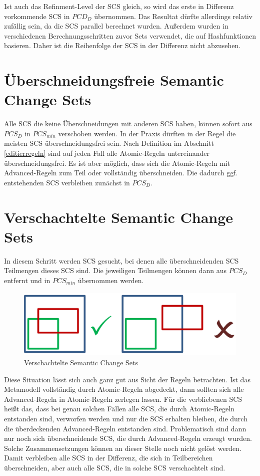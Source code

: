 Ist auch das Refinment-Level der SCS gleich, so wird das erste in Differenz vorkommende SCS in
$PCD_D$ übernommen. Das Resultat dürfte allerdings relativ zufällig sein, da die SCS parallel
berechnet wurden. Außerdem wurden in verschiedenen Berechnungsschritten zuvor Sets verwendet, die
auf Hashfunktionen basieren. Daher ist die Reihenfolge der SCS in der Differenz nicht abzusehen.

\section{Überschneidungsfreie Semantic Change Sets}

Alle SCS die keine Überschneidungen mit anderen SCS haben, können sofort aus $PCS_D$ in $PCS_{min}$
verschoben werden. In der Praxis dürften in der Regel die meisten SCS überschneidungsfrei sein. Nach
Definition im Abschnitt \ref{editierregeln} sind auf jeden Fall alle Atomic-Regeln untereinander
überschneidungsfrei. Es ist aber möglich, dass sich die Atomic-Regeln mit Advanced-Regeln zum Teil
oder vollständig überschneiden. Die dadurch ggf. entstehenden SCS verbleiben zunächst in $PCS_D$.

\section{Verschachtelte Semantic Change Sets}

In diesem Schritt werden SCS gesucht, bei denen alle überschneidenden SCS Teilmengen dieses SCS
sind. Die jeweiligen Teilmengen können dann aus $PCS_D$ entfernt und in $PCS_{min}$ übernommen
werden.

\begin{figure}[h!]
  \centering
  \includegraphics[scale=0.5]{images/post_processing_nested.png}
  \caption{Verschachtelte Semantic Change Sets}
  \label{fig:post_processing_nested}
\end{figure}

Diese Situation lässt sich auch ganz gut aus Sicht der Regeln betrachten. Ist das Metamodell
vollständig durch Atomic-Regeln abgedeckt, dann sollten sich alle Advanced-Regeln in Atomic-Regeln
zerlegen lassen. Für die verbliebenen SCS heißt das, dass bei genau solchen Fällen alle SCS, die
durch Atomic-Regeln entstanden sind, verworfen werden und nur die SCS erhalten bleiben, die durch
die überdeckenden Advanced-Regeln entstanden sind. Problematisch sind dann nur noch sich überschneidende
SCS, die durch Advanced-Regeln erzeugt wurden. Solche Zusammensetzungen können an dieser Stelle noch
nicht gelöst werden. Damit verbleiben alle SCS in der Differenz, die sich in Teilbereichen
überschneiden, aber auch alle SCS, die in solche SCS verschachtelt sind.

